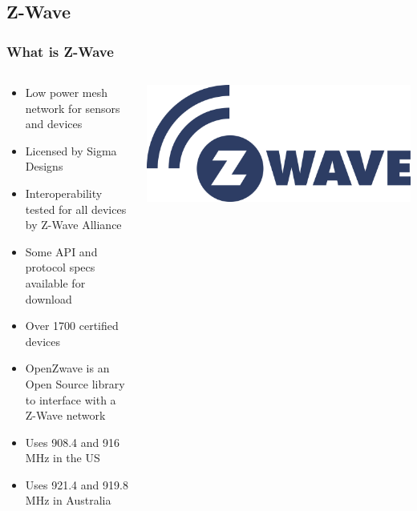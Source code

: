 \documentclass[aspectratio=169,11pt,hyperref={colorlinks=true}]{beamer}
\begin{document}
\subsection{Z-Wave}
\begin{frame}
    \frametitle{What is Z-Wave}
    \begin{columns}
        \begin{column}{.48\textwidth}
            \begin{itemize}
                \item Low power mesh network for sensors and devices
                \item Licensed by Sigma Designs
                \item Interoperability tested for all devices by Z-Wave Alliance
                \item Some API and protocol specs available for download
                \item Over 1700 certified devices
                \item OpenZwave is an Open Source library to interface with a Z-Wave network
                \item Uses 908.4 and 916 MHz in the US
                \item Uses 921.4 and 919.8 MHz in Australia
            \end{itemize}
        \end{column}
        \begin{column}{.48\textwidth}
            \includegraphics[width=\textwidth]{zwave.png}
        \end{column}
    \end{columns}
\end{frame}
\end{document}

